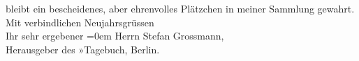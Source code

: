 \begin{ledgroupsized}[t]{13cm}
               bleibt ein bescheidenes, aber ehrenvolles Plätzchen in meiner Sammlung gewahrt.\pend
           \pstart
           Mit verbindlichen Neujahrsgrüssen{\\[\baselineskip]}Ihr sehr ergebener\pend
           \leftskip=0em{}{\bigskip}\pstart
           \noindent{}Herrn Stefan Grossmann,{\\}Herausgeber des »Tagebuch\label{T_L02459_1v}\label{T_L02459_1h}, Berlin.\pend
                     \endnumbering{}\end{ledgroupsized}  \newcommand{\dateiname}{L02459}\newcommand{\titel}{Arthur Schnitzler an Stefan Großmann, 24. 12. 1925}\newcommand{\editorInnen}{Martin Anton Müller und Gerd-Hermann Susen}
            \footnotesize
\begin{ledgroupsized}[t]{11.5cm}
\end{ledgroupsized}
         
      